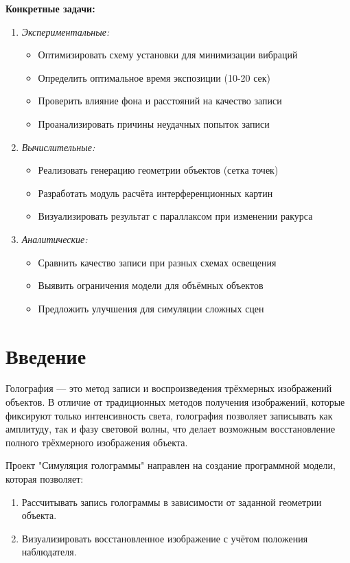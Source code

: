 \documentclass[aps,twocolumn,secnumarabic,balancelastpage,amsmath,amssymb,nofootinbib, floatfix]{revtex4-1}
\begin{document}
	\textbf{Конкретные задачи:}
	\begin{enumerate}
		\item \textit{Экспериментальные:}
		\begin{itemize}
			\item Оптимизировать схему установки для минимизации вибраций
			\item Определить оптимальное время экспозиции (10-20 сек)
			\item Проверить влияние фона и расстояний на качество записи
			\item Проанализировать причины неудачных попыток записи
		\end{itemize}
		\item \textit{Вычислительные:}
		\begin{itemize}
			\item Реализовать генерацию геометрии объектов (сетка точек)
			\item Разработать модуль расчёта интерференционных картин
			\item Визуализировать результат с параллаксом при изменении ракурса
		\end{itemize}
		\item \textit{Аналитические:}
		\begin{itemize}
			\item Сравнить качество записи при разных схемах освещения
			\item Выявить ограничения модели для объёмных объектов
			\item Предложить улучшения для симуляции сложных сцен
		\end{itemize}
	\end{enumerate}



\section{Введение}  

Голография — это метод записи и воспроизведения трёхмерных изображений объектов. В отличие от традиционных методов получения изображений, которые фиксируют только интенсивность света, голография позволяет записывать как амплитуду, так и фазу световой волны, что делает возможным восстановление полного трёхмерного изображения объекта.  

Проект "Симуляция голограммы" направлен на создание программной модели, которая позволяет:  \begin{enumerate}
\item Рассчитывать запись голограммы в зависимости от заданной геометрии объекта.  
\item Визуализировать восстановленное изображение с учётом положения наблюдателя.  
\end{enumerate}
\end{document}
